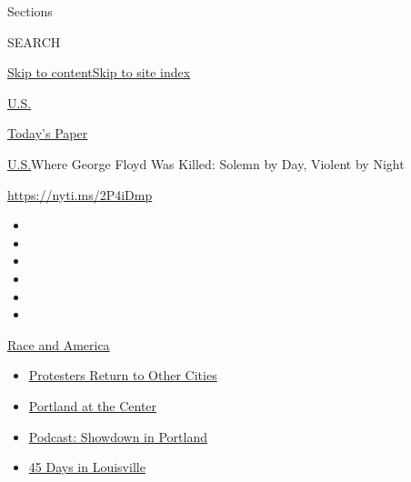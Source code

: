 Sections

SEARCH

\protect\hyperlink{site-content}{Skip to
content}\protect\hyperlink{site-index}{Skip to site index}

\href{https://www.nytimes3xbfgragh.onion/section/us}{U.S.}

\href{https://myaccount.nytimes3xbfgragh.onion/auth/login?response_type=cookie\&client_id=vi}{}

\href{https://www.nytimes3xbfgragh.onion/section/todayspaper}{Today's
Paper}

\href{/section/us}{U.S.}\textbar{}Where George Floyd Was Killed: Solemn
by Day, Violent by Night

\url{https://nyti.ms/2P4iDmp}

\begin{itemize}
\item
\item
\item
\item
\item
\item
\end{itemize}

\href{https://www.nytimes3xbfgragh.onion/news-event/george-floyd-protests-minneapolis-new-york-los-angeles?action=click\&pgtype=Article\&state=default\&region=TOP_BANNER\&context=storylines_menu}{Race
and America}

\begin{itemize}
\tightlist
\item
  \href{https://www.nytimes3xbfgragh.onion/2020/07/26/us/protests-portland-seattle-trump.html?action=click\&pgtype=Article\&state=default\&region=TOP_BANNER\&context=storylines_menu}{Protesters
  Return to Other Cities}
\item
  \href{https://www.nytimes3xbfgragh.onion/2020/07/24/us/portland-oregon-protests-white-race.html?action=click\&pgtype=Article\&state=default\&region=TOP_BANNER\&context=storylines_menu}{Portland
  at the Center}
\item
  \href{https://www.nytimes3xbfgragh.onion/2020/07/23/podcasts/the-daily/portland-protests.html?action=click\&pgtype=Article\&state=default\&region=TOP_BANNER\&context=storylines_menu}{Podcast:
  Showdown in Portland}
\item
  \href{https://www.nytimes3xbfgragh.onion/interactive/2020/07/16/us/black-lives-matter-protests-louisville-breonna-taylor.html?action=click\&pgtype=Article\&state=default\&region=TOP_BANNER\&context=storylines_menu}{45
  Days in Louisville}
\end{itemize}

